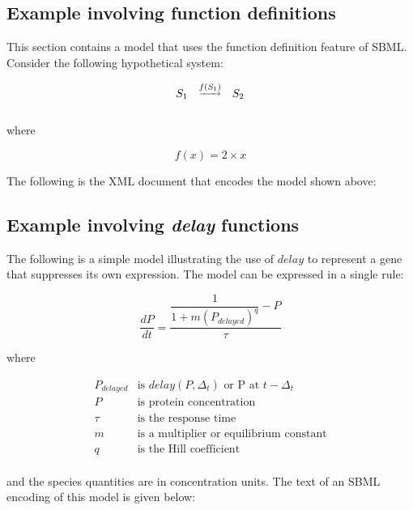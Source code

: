 \subsection{Example involving function definitions}
\label{sec:functioneg}

This section contains a model that uses the function definition
feature of SBML.  Consider the following hypothetical system:
\begin{linenomath}
\begin{equation*}
  \begin{array}{@{}ccc@{}}
    S_1 & \overset{\underrightarrow{f(S_1)}}{} & S_2 \\ \\[-4pt]
  \end{array}
\end{equation*}
\end{linenomath}
where
\begin{linenomath}
\begin{equation*}
    f(x) = 2 \times x
\end{equation*}
\end{linenomath}

The following is the XML document that encodes the model shown
above:



\subsection{Example involving \emph{delay} functions}
\label{sec:delayeg}

The following is a simple model illustrating the use of $delay$ to
represent a gene that suppresses its own expression.  The model
can be expressed in a single rule:
\begin{linenomath}
\begin{equation*}
  \frac{d P}{d t} = \dfrac{ \dfrac{1}{1 + m (P_{delayed})^q} - P }{ \tau }
\end{equation*}
\end{linenomath}
where
\begin{linenomath}
\begin{equation*}
\begin{array}{rl}
P_{delayed} & \mbox{is } delay(P, \Delta_t) \mbox{ or P at } t - \Delta_t\\
P & \mbox{is protein concentration}\\
\tau & \mbox{is the response time}\\
m & \mbox{is a multiplier or equilibrium constant}\\
q & \mbox{is the Hill coefficient}\\
\end{array}
\end{equation*}
\end{linenomath}
and the species quantities are in concentration units.
The text of an SBML encoding of this model is given below:

